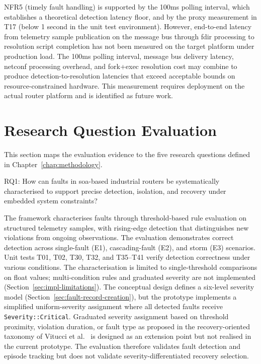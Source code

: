 NFR5 (timely fault handling) is supported by the 100ms polling interval, which establishes a theoretical detection latency floor, and by the proxy measurement in T17 (below 1 second in the unit test environment). However, end-to-end latency from telemetry sample publication on the message bus through \gls{fdir} processing to resolution script completion has not been measured on the target platform under production load. The 100ms polling interval, message bus delivery latency, \gls{netconf} processing overhead, and fork+exec resolution cost may combine to produce detection-to-resolution latencies that exceed acceptable bounds on resource-constrained hardware. This measurement requires deployment on the actual router platform and is identified as future work.

\section{Research Question Evaluation}\label{sec:rq-evaluation}

This section maps the evaluation evidence to the five research questions defined in Chapter~\ref{chap:methodology}.

RQ1: How can faults in \gls{soa}-based industrial routers be systematically characterised to support precise detection, isolation, and recovery under embedded system constraints?

The framework characterises faults through threshold-based rule evaluation on structured telemetry samples, with rising-edge detection that distinguishes new violations from ongoing observations. The evaluation demonstrates correct detection across single-fault (E1), cascading-fault (E2), and storm (E3) scenarios. Unit tests T01, T02, T30, T32, and T35--T41 verify detection correctness under various conditions. The characterisation is limited to single-threshold comparisons on float values; multi-condition rules and graduated severity are not implemented (Section~\ref{sec:impl-limitations}). The conceptual design defines a six-level severity model (Section~\ref{sec:fault-record-creation}), but the prototype implements a simplified uniform-severity assignment where all detected faults receive \texttt{Severity::Critical}. Graduated severity assignment based on threshold proximity, violation duration, or fault type as proposed in the recovery-oriented taxonomy of Vitucci et al.~\cite{ref1,ref2} is designed as an extension point but not realised in the current prototype. The evaluation therefore validates fault detection and episode tracking but does not validate severity-differentiated recovery selection.

